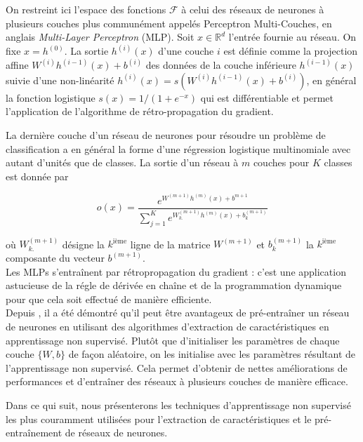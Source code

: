 On restreint ici l'espace des fonctions $\mathcal{F}$ à celui des réseaux de
neurones à plusieurs couches plus communément appelés Perceptron Multi-Couches,
en anglais \textit{Multi-Layer Perceptron} (MLP)\cite{Rosenblatt-1958}. Soit
$x\in\mathbb{R}^d$ l'entrée fournie au réseau. On fixe $x=h^{(0)}$. La sortie
$h^{(i)}(x)$ d'une couche $i$ est définie comme la projection affine
$W^{(i)}h^{(i-1)}(x) + b^{(i)}$ des données de la couche inférieure $h^{(i-1)}(x)$
suivie d'une non-linéarité $h^{(i)}(x)= s(W^{(i)}h^{(i-1)}(x) + b^{(i)})$, en
général la fonction logistique $s(x)=1/(1+e^{-x})$ qui est différentiable et
permet l'application de l'algorithme de rétro-propagation du gradient. 

La dernière couche d'un réseau de neurones pour résoudre un problème de
classification a en général la forme d'une régression logistique multinomiale
avec autant d'unités que de classes. La sortie d'un réseau à $m$ couches pour
$K$ classes est donnée par

\begin{equation}
o(x) = \frac{e^{W^{(m+1)} h^{(m)}(x) + b^{m+1}}}{\sum_{j=1}^K e^{W^{(m+1)}_{k.} h^{(m)}(x) + b^{(m+1)}_k }}
\end{equation}

où $W_{k.}^{(m+1)}$ désigne la $k^\textrm{ième}$ ligne de la matrice $W^{(m+1)}$
et $b_k^{(m+1)}$ la $k^\textrm{ième}$ composante du vecteur $b^{(m+1)}$.
\\

Les MLPs s'entraînent par rétropropagation du gradient \cite{Rumelhart86b}: c'est une application
astucieuse de la régle de dérivée en chaîne et de la programmation dynamique
pour que cela soit effectué de manière efficiente.
\\

Depuis \cite{Hinton06,Bengio-nips-2006}, il a été démontré qu'il peut être
avantageux de pré-entraîner un réseau de neurones en utilisant des algorithmes
d'extraction de caractéristiques en apprentissage non supervisé. Plutôt que
d'initialiser les paramètres de chaque couche $\lbrace W,b \rbrace$ de façon
aléatoire, on les initialise avec les paramètres résultant de l'apprentissage
non supervisé.  Cela permet d'obtenir de nettes améliorations de performances
et d'entraîner des réseaux à plusieurs couches de manière efficace.

Dans ce qui suit, nous présenterons les techniques d'apprentissage non
supervisé les plus couramment utilisées pour l'extraction de caractéristiques
et le pré-entraînement de réseaux de neurones.


